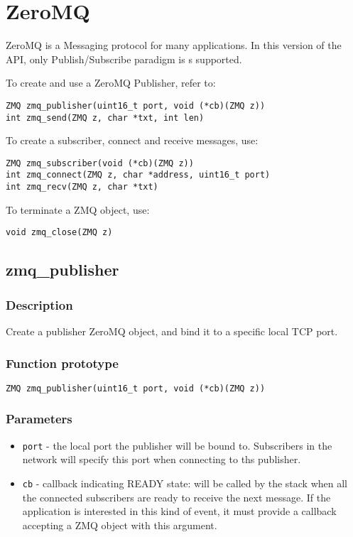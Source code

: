 \section{ZeroMQ}

ZeroMQ is a Messaging protocol for many applications. In this version of the API, only Publish/Subscribe paradigm is s
supported.

To create and use a ZeroMQ Publisher, refer to:
\begin{verbatim}
ZMQ zmq_publisher(uint16_t port, void (*cb)(ZMQ z))
int zmq_send(ZMQ z, char *txt, int len)
\end{verbatim}

To create a subscriber, connect and receive messages, use:
\begin{verbatim}
ZMQ zmq_subscriber(void (*cb)(ZMQ z))
int zmq_connect(ZMQ z, char *address, uint16_t port)
int zmq_recv(ZMQ z, char *txt)
\end{verbatim}

To terminate a ZMQ object, use:
\begin{verbatim}
void zmq_close(ZMQ z)
\end{verbatim}

\subsection{zmq\_publisher}
\subsubsection*{Description}
Create a publisher ZeroMQ object, and bind it to a specific local TCP port.

\subsubsection*{Function prototype}
\begin{verbatim}
ZMQ zmq_publisher(uint16_t port, void (*cb)(ZMQ z))
\end{verbatim}

\subsubsection*{Parameters}
\begin{itemize}[noitemsep]
\item \texttt{port} - the local port the publisher will be bound to. Subscribers in the network will specify this port when connecting to ths publisher.
\item \texttt{cb} - callback indicating READY state: will be called by the stack when all the connected subscribers are ready to receive the next message. If the application is interested in this kind of event, it must provide a callback accepting a ZMQ object with this argument.
\end{itemize}

